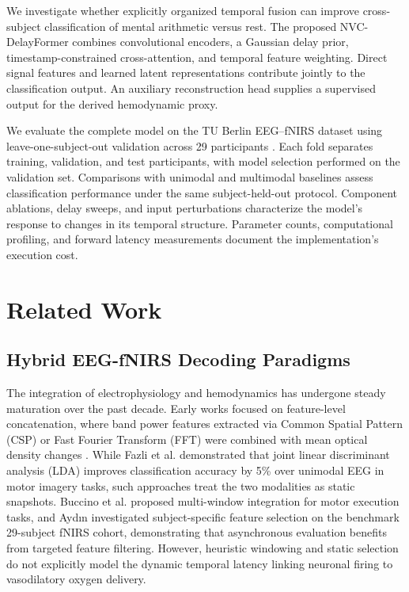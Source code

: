 \documentclass[final,5p,times,twocolumn]{elsarticle}
\begin{document}
We investigate whether explicitly organized temporal fusion can improve cross-subject classification of mental arithmetic versus rest. The proposed NVC-DelayFormer combines convolutional encoders, a Gaussian delay prior, timestamp-constrained cross-attention, and temporal feature weighting. Direct signal features and learned latent representations contribute jointly to the classification output. An auxiliary reconstruction head supplies a supervised output for the derived hemodynamic proxy.

We evaluate the complete model on the TU Berlin EEG--fNIRS dataset using leave-one-subject-out validation across 29 participants \cite{shin2017open}. Each fold separates training, validation, and test participants, with model selection performed on the validation set. Comparisons with unimodal and multimodal baselines assess classification performance under the same subject-held-out protocol. Component ablations, delay sweeps, and input perturbations characterize the model's response to changes in its temporal structure. Parameter counts, computational profiling, and forward latency measurements document the implementation's execution cost.

\section{Related Work}
\label{sec:related}

\subsection{Hybrid EEG-fNIRS Decoding Paradigms}
The integration of electrophysiology and hemodynamics has undergone steady maturation over the past decade. Early works focused on feature-level concatenation, where band power features extracted via Common Spatial Pattern (CSP) or Fast Fourier Transform (FFT) were combined with mean optical density changes \cite{fazli2012enhanced}. While Fazli et al. demonstrated that joint linear discriminant analysis (LDA) improves classification accuracy by 5\% over unimodal EEG in motor imagery tasks, such approaches treat the two modalities as static snapshots. Buccino et al. \cite{buccino2016hybrid} proposed multi-window integration for motor execution tasks, and Ayd{\i}n \cite{aydin2020subject} investigated subject-specific feature selection on the benchmark 29-subject fNIRS cohort, demonstrating that asynchronous evaluation benefits from targeted feature filtering. However, heuristic windowing and static selection do not explicitly model the dynamic temporal latency linking neuronal firing to vasodilatory oxygen delivery.
\end{document}
